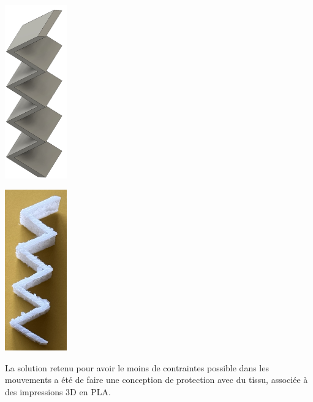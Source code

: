 \begin{minipage}[c]{0.48\textwidth}
    \begin{center}
        \includegraphics[width=0.2\textwidth]{assets/figures/Protections_laser/Securite_mecanique/Protection_vers_microscope/zigzag_model.jpeg}
    \end{center}
    \label{zigzag_model}
\end{minipage}\hfill
\begin{minipage}[c]{0.48\textwidth}
    \begin{center}
        \includegraphics[width=0.2\textwidth]{assets/figures/Protections_laser/Securite_mecanique/Protection_vers_microscope/zigzag_reel.jpeg}
    \end{center}
    \label{zigzag_reel}
\end{minipage}

La solution retenu pour avoir le moins de contraintes possible dans les mouvements a été de faire une conception de protection avec du tissu, associée à des impressions 3D en PLA.

